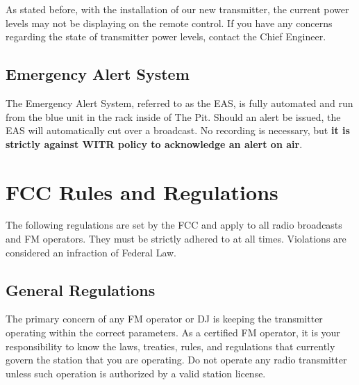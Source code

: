 \documentclass{witrman}
\begin{document}
As stated before, with the installation of our new transmitter, the current
power levels may not be displaying on the remote control. If you have any
concerns regarding the state of transmitter power levels, contact the Chief
Engineer.

\section{Emergency Alert System}
The Emergency Alert System, referred to as the EAS, is fully automated and run
from the blue unit in the rack inside of The Pit. Should an alert be issued, the
EAS will automatically cut over a broadcast. No recording is necessary, but
\textbf{it is strictly against WITR policy to acknowledge an alert on air}.

\chapter{FCC Rules and Regulations}
The following regulations are set by the FCC and apply to all radio broadcasts
and FM operators. They must be strictly adhered to at all times. Violations are
considered an infraction of Federal Law.

\section{General Regulations}
The primary concern of any FM operator or DJ is keeping the transmitter
operating within the correct parameters. As a certified FM operator, it is your
responsibility to know the laws, treaties, rules, and regulations that currently
govern the station that you are operating. Do not operate any radio transmitter
unless such operation is authorized by a valid station license.
\end{document}
